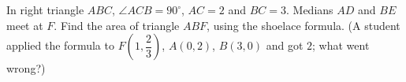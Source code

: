 In right triangle $ABC$, $\angle ACB=90^\circ$, $AC=2$ and $BC=3$. Medians $AD$ and $BE$ meet at $F$. Find the area of triangle $ABF$, using the shoelace formula. (A student applied the formula to $F\left(1,\dfrac{2}{3}\right)$, $A(0,2)$, $B(3,0)$ and got $2$; what went wrong?)
